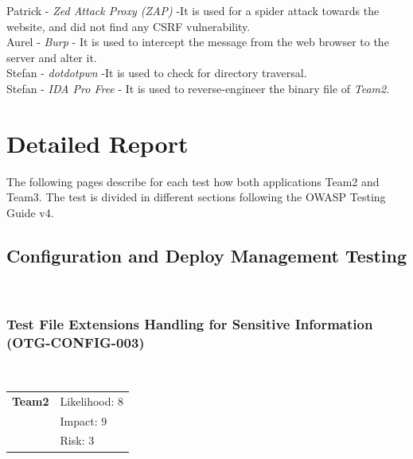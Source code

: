 \documentclass[headsepline,footsepline,footinclude=false,oneside,fontsize=11pt,paper=a4,listof=totoc,bibliography=totoc]{scrbook} %
\begin{document}
Patrick - \textit{Zed Attack Proxy (ZAP)} -It is used for a spider attack towards the website, and did not find any CSRF vulnerability.\\

Aurel - \textit{Burp} - It is used to intercept the message from the web browser to the server and alter it.\\

Stefan - \textit{dotdotpwn} -It is used to check for directory traversal.\\

Stefan - \textit{IDA Pro Free} - It is used to reverse-engineer the binary file of \textit{Team2}.

\chapter{Detailed Report}

The following pages describe for each test how both applications Team2 and Team3. The test is divided in different sections following the OWASP Testing Guide v4.

\pagebreak


\section{Configuration and Deploy Management Testing}\
\subsection{Test File Extensions Handling for Sensitive Information (OTG-CONFIG-003)}\

\begin{tabular}{cR{12cm}}
	\textbf{Team2} & Likelihood: 8\\& Impact: 9\\& Risk: 3
\end{tabular}
\end{document}

